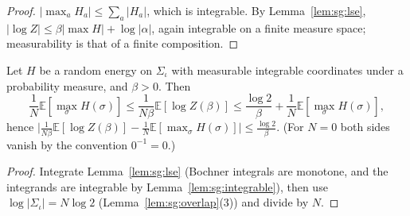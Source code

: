 \begin{proof}
  \leanok
$|\max_aH_a|\le\sum_a|H_a|$, which is integrable. By Lemma~\ref{lem:sg:lse},
$|\log Z|\le\beta|\max H|+\log|\alpha|$, again integrable on a finite measure space; measurability is that of a
finite composition.
\end{proof}

\begin{theorem}\label{thm:sg:smooth}
  \leanok
Let $H$ be a random energy on $\Sigma_\iota$ with measurable integrable coordinates under a probability measure, and
$\beta>0$. Then
\[\frac1N\mathbb E[\max_\sigma H(\sigma)]\le\frac{1}{N\beta}\mathbb E[\log Z(\beta)]\le
\frac{\log2}{\beta}+\frac1N\mathbb E[\max_\sigma H(\sigma)],\]
hence $\big|\frac1{N\beta}\mathbb E[\log Z(\beta)]-\frac1N\mathbb E[\max_\sigma H(\sigma)]\big|\le\frac{\log2}\beta$.
(For $N=0$ both sides vanish by the convention $0^{-1}=0$.)
\end{theorem}

\begin{proof}
  \leanok
Integrate Lemma~\ref{lem:sg:lse} (Bochner integrals are monotone, and the integrands are integrable by
Lemma~\ref{lem:sg:integrable}), then use $\log|\Sigma_\iota|=N\log2$ (Lemma~\ref{lem:sg:overlap}(3)) and divide
by $N$.
\end{proof}

